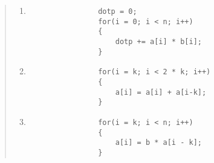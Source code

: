 \documentclass{article}
\begin{document}
\begin{quote}
\begin{enumerate}
            \item \begin{verbatim}
                dotp = 0;
                for(i = 0; i < n; i++)
                {
                    dotp += a[i] * b[i];
                }
            \end{verbatim}

            \item \begin{verbatim}
                for(i = k; i < 2 * k; i++)
                {
                    a[i] = a[i] + a[i-k];
                }
            \end{verbatim}

            \item \begin{verbatim}
                for(i = k; i < n; i++)
                {
                    a[i] = b * a[i - k];
                }
            \end{verbatim}
        \end{enumerate}
    \end{quote}
\end{document}
